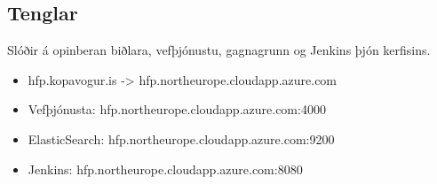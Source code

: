 \documentclass{article}
\theoremstyle{blueP}
\theoremstyle{greenS}
\begin{document}
\subsection{Tenglar}
Slóðir á opinberan biðlara, vefþjónustu, gagnagrunn og Jenkins þjón kerfisins.
\begin{itemize}
    \item hfp.kopavogur.is -> hfp.northeurope.cloudapp.azure.com
    \item Vefþjónusta: hfp.northeurope.cloudapp.azure.com:4000
    \item ElasticSearch: hfp.northeurope.cloudapp.azure.com:9200
    \item Jenkins: hfp.northeurope.cloudapp.azure.com:8080
\end{itemize}
\end{document}
